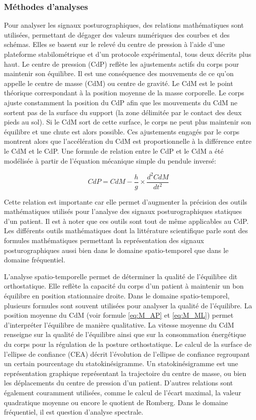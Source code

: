 \subsubsection{Méthodes d’analyses}
Pour analyser les signaux posturographiques, des relations mathématiques sont utilisées, permettant de dégager des valeurs numériques des courbes et des schémas. 
Elles se basent sur le relevé du centre de pression à l’aide d’une plateforme stabilométrique et d’un protocole expérimental, tous deux décrits plus haut.
Le centre de pression (CdP) reflète les ajustements actifs du corps pour maintenir son équilibre. 
Il est une conséquence des mouvements de ce qu’on appelle le centre de masse (CdM) ou centre de gravité. 
Le CdM est le point théorique correspondant à la position moyenne de la masse corporelle. 
Le corps ajuste constamment la position du CdP afin que les mouvements du CdM ne sortent pas de la surface du support (la zone délimitée par le contact des deux pieds au sol). 
Si le CdM sort de cette surface, le corps ne peut plus maintenir son équilibre et une chute est alors possible.
Ces ajustements engagés par le corps montrent alors que l’accélération du CdM est proportionnelle à la différence entre le CdM et le CdP.
Une formule de relation entre le CdP et le CdM a été modélisée à partir de l’équation mécanique simple du pendule inversé:

\begin{equation}
    CdP = CdM - \frac{h}{g} \times \frac{d^2 CdM}{dt^2} 
    \label{eq:CdP}
\end{equation}

Cette relation est importante car elle permet d’augmenter la précision des outils mathématiques utilisés pour l’analyse des signaux posturographiques statiques d’un patient. 
Il est à noter que ces outils sont tout de même applicables au CdP.
Les différents outils mathématiques dont la littérature scientifique parle sont des formules mathématiques permettant la représentation des signaux posturographiques aussi bien dans le domaine spatio-temporel que dans le domaine fréquentiel. 

L’analyse spatio-temporelle permet de déterminer la qualité de l’équilibre dit orthostatique. 
Elle reflète la capacité du corps d’un patient à maintenir un bon équilibre en position stationnaire droite. 
Dans le domaine spatio-temporel, plusieurs formules sont souvent utilisées pour analyser la qualité de l’équilibre. 
La position moyenne du CdM (voir formule \ref{eq:M_AP} et \ref{eq:M_ML}) permet d’interpréter l’équilibre de manière qualitative. 
La vitesse moyenne du CdM renseigne sur la qualité de l’équilibre ainsi que sur la consommation énergétique du corps pour la régulation de la posture orthostatique. 
Le calcul de la surface de l’ellipse de confiance (CEA) décrit l’évolution de l’ellipse de confiance regroupant un certain pourcentage du statokinésigramme. 
Un statokinésigramme est une représentation graphique représentant la trajectoire du centre de masse, ou bien les déplacements du centre de pression d’un patient. 
D’autres relations sont également couramment utilisées, comme le calcul de l’écart maximal, la valeur quadratique moyenne ou encore le quotient de Romberg.
Dans le domaine fréquentiel, il est question d’analyse spectrale. 

